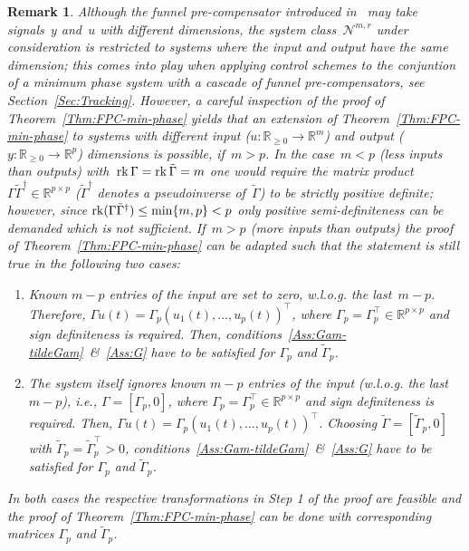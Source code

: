 \documentclass[ envcountsect, envcountsame]{svjour3}
\newtheorem{Remark}[Theorem]{Remark}
\newcommand{\R}{\mathbb{R}}
\newcommand{\cN}{\mathcal{N}}
\newcommand{\rp}{\mathbb{R}_{\geq 0}}
\DeclareMathOperator{\rk}{\rm rk}
\def\red#1{\textcolor[rgb]{0.60,0.10,0.07}{#1}}
\begin{document}
\begin{Remark}
Although the funnel pre-compensator introduced in~\cite{BergReis18b} may take signals~$y$ and~$u$ with different dimensions, the system class~$\cN^{m,r}$ under consideration is restricted to systems where the input and output have the same dimension;
this comes into play when applying control schemes to the conjuntion of a minimum phase system with a cascade of funnel pre-compensators, see Section~\ref{Sec:Tracking}. 
However, a careful inspection of the proof of Theorem~\ref{Thm:FPC-min-phase} yields that an extension of Theorem~\ref{Thm:FPC-min-phase} to systems with different input ($u :\rp \to \R^m$) and output ($y: \rp \to \R^p$) dimensions is possible, if~$m > p$. 
In the case~$m < p$ (less inputs than outputs) with~$\rk \Gamma = \rk \tilde \Gamma = m$ one would require the matrix product~$\Gamma \tilde \Gamma^\dagger \in \R^{p \times p}$ ($\tilde \Gamma^\dagger$ denotes a pseudoinverse of~$\tilde \Gamma$) to be strictly positive definite; however, since $\rk(\Gamma \tilde \Gamma^\dagger) \le \min\{ m,p \} < p$ only positive semi-definiteness can be demanded which is not sufficient.
If~$ m > p$ (more inputs than outputs) the proof of Theorem~\ref{Thm:FPC-min-phase} can be adapted such that the statement is still true in the following two cases:
\begin{enumerate}[label = (\roman{enumi}), leftmargin=*]
\item Known $m-p$ entries of the input are set to zero, w.l.o.g. the last~$m-p$. 
Therefore, $\Gamma u(t) = \Gamma_p (u_1(t), \ldots, u_p(t))^\top$, where $\Gamma_p = \Gamma_p^\top \in \R^{p \times p}$ and sign definiteness is required.
Then, conditions~\ref{Ass:Gam-tildeGam}~\&~\ref{Ass:G} have to be satisfied for $\Gamma_p$ and $\tilde \Gamma_p$.
\item The system itself ignores known $m-p$ entries of the input (w.l.o.g. the last~$m-p$), i.e., $\Gamma = [\Gamma_p, 0]$, where $\Gamma_p = \Gamma_p^\top \in \R^{p \times p} $ and sign definiteness is required. 
Then, $\Gamma u(t) = \Gamma_p (u_1(t),\ldots,u_p(t))^\top$.
Choosing $\tilde \Gamma = [\tilde \Gamma_p, 0]$ with $\tilde \Gamma_p = \tilde \Gamma_p^\top > 0$, conditions~\ref{Ass:Gam-tildeGam}~\&~\ref{Ass:G} have to be satisfied for $\Gamma_p$ and $\tilde \Gamma_p$. 
\end{enumerate}
In both cases the respective transformations in \emph{Step 1} of the proof are feasible and the proof of Theorem~\ref{Thm:FPC-min-phase} can be done with corresponding matrices $\Gamma_p$ and $ \tilde \Gamma_p$.
\end{Remark}
\end{document}
